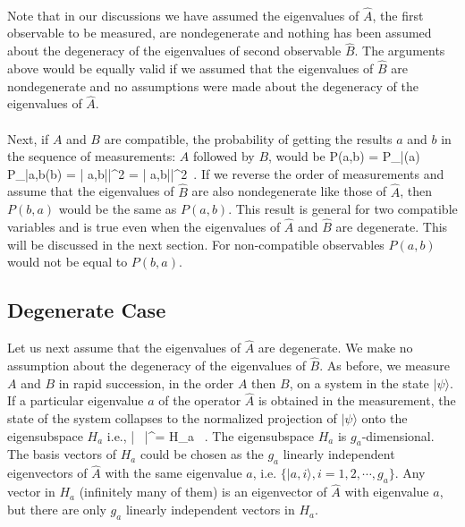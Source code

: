 \paragraph{}
Note that in our discussions we have assumed the eigenvalues
of $\hat{A}$, the first observable to be measured, are nondegenerate and nothing has been assumed about the degeneracy of the eigenvalues of second observable $\hat{B}$. The arguments above would be equally valid if we assumed that the eigenvalues of $\hat{B}$ are nondegenerate and no assumptions were made about the degeneracy of the eigenvalues of $\hat{A}$.

\paragraph{}
Next, if $A$ and $B$ are compatible, the probability of getting the results $a$ and $b$ in the sequence
of measurements: $A$ followed by $B$,  would be
\be 
P(a,b) = P_{|\psi\rangle}(a) P_{|a,b\rangle}(b) = \left| \langle a,b|\psi\rangle \right|^2  = \left| \langle a,b|\psi\rangle \right|^2\, .
\ee
If we reverse the order of measurements and assume that the eigenvalues of $\hat{B}$ are also nondegenerate like those of $\hat{A}$, 
then $P(b,a)$ would be the same as $P(a,b)$. This result is general for two compatible variables and is true even when the eigenvalues 
of $\hat{A}$ and $\hat{B}$ are degenerate. This will be discussed in the next section.  For non-compatible observables $P(a,b)$ would not be equal to $P(b,a)$.



\subsection{Degenerate Case}
Let us next assume  that the eigenvalues of $\hat{A}$ are degenerate. We make no assumption about
 the degeneracy of the eigenvalues of $\hat{B}$. As before, we measure $A$ and $B$ in rapid succession, in the order
$A$ then $B$, on a system in the state $|\psi\rangle$. If a particular eigenvalue $a$ of the operator $\hat{A}$ is
obtained in the measurement, the state of the system collapses to the normalized projection of $|\psi\rangle$ onto the eigensubspace $H_a$ i.e.,
\be
|\psi\rangle {} \, |\psi^{\prime}\rangle = 
{} \in H_a \, .
\ee
The eigensubspace $H_a$ is $g_a$-dimensional. The basis vectors of $H_a$ could be chosen as the $g_a$ linearly independent eigenvectors 
of $\hat{A}$  with the same eigenvalue $a$, i.e. $\{|a,i\rangle, i = 1,2, \cdots , g_a\}$. Any vector in $H_a$ 
(infinitely many of them) is an eigenvector of $\hat{A}$ with eigenvalue $a$, but there are only $g_a$ linearly independent vectors 
in $H_a$.


